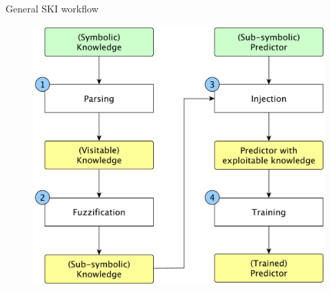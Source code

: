 \documentclass[presentation]{beamer}\mode<presentation>{\usetheme{AMSBolognaFC}}
\begin{document}
\begin{frame}{General SKI workflow}
    
    \begin{figure}
        \centering
        \includegraphics[width=0.8\textheight]{figures/ski-workflow.pdf}
    \end{figure}
    
\end{frame}
\end{document}
